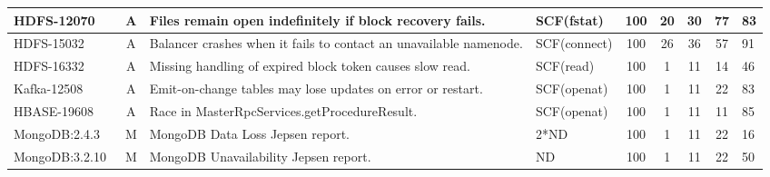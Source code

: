 \begin{table*}[t!]
\begin{tabular}{l|c|l|l|c|c|c|c|l}
		HDFS-12070~\cite{hdfs12070}                                                                                                 & A            & Files remain open indefinitely if block recovery fails.                 & SCF(fstat)                                                              & 100             & 20             & 30           & 77                & 83            \\ \hline
		HDFS-15032~\cite{hdfs15032}                                                                                                 & A            & Balancer crashes when it fails to contact an unavailable namenode.      & SCF(connect)                                                            & 100             & 26             & 36           & 57                & 91            \\ \hline
		HDFS-16332~\cite{hdfs16332}                                                                                                 & A            & Missing handling of expired block token causes slow read.               & SCF(read)                                                               & 100             & 1              & 11           & 14                & 46            \\ \hline
		Kafka-12508~\cite{kafka12508}                                                                                               & A            & Emit-on-change tables may lose updates on error or restart.             & SCF(openat)                                                             & 100             & 1              & 11           & 22                & 83            \\ \hline
		HBASE-19608~\cite{hbase19608}                                                                                               & A            & Race in MasterRpcServices.getProcedureResult.                           & SCF(openat)                                                             & 100             & 1              & 11           & 11                & 85            \\ \hline
		MongoDB:2.4.3~\cite{mongo-2-4-3}                                                                                            & M            & MongoDB Data Loss Jepsen report.                                        & 2*ND                                                                    & 100             & 1              & 11           & 22                & 16            \\ \hline
		MongoDB:3.2.10~\cite{mongo-3-2-10}                                                                                          & M            & MongoDB Unavailability Jepsen report.                                   & ND                                                                      & 100             & 1              & 11           & 22                & 50            \\ \hline

\end{tabular}
\end{table*}

